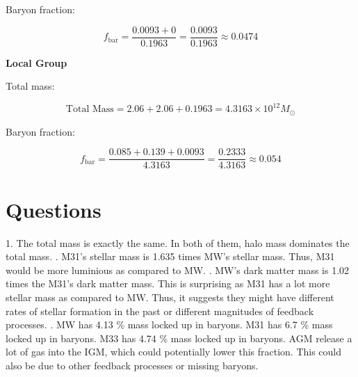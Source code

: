 \documentclass{article}
\begin{document}
Baryon fraction:

\[
f_{\text{bar}} = \frac{0.0093 + 0}{0.1963} = \frac{0.0093}{0.1963} \approx \boxed{0.0474}
\]

\textbf{{Local Group}}

Total mass:

\[
\text{Total Mass} = 2.06 + 2.06 + 0.1963  = \boxed {4.3163 \times 10^{12} M_{\odot}}
\]

Baryon fraction:

\[
f_{\text{bar}} = \frac{0.085 + 0.139 + 0.0093}{4.3163} = \frac{0.2333}{4.3163} \approx \boxed{0.054}
\]

\section{Questions}
1. The total mass is exactly the same. In both of them, halo mass dominates the total mass.
\newline {}. M31's stellar mass is 1.635 times MW's stellar mass. Thus, M31 would be more luminious as compared to MW.
\newline {}. MW's dark matter mass is 1.02 times the M31's dark matter mass. This is surprising as M31 has a lot more stellar mass as compared to MW. Thus, it suggests they might have different rates of stellar formation in the past or different magnitudes of feedback processes.
\newline {}. MW has 4.13 \% mass locked up in baryons. M31 has 6.7 \% mass locked up in baryons. M33 has 4.74 \% mass locked up in baryons.
AGM release a lot of gas into the IGM, which could potentially lower this fraction. This could also be due to other feedback processes or missing baryons.
\end{document}
